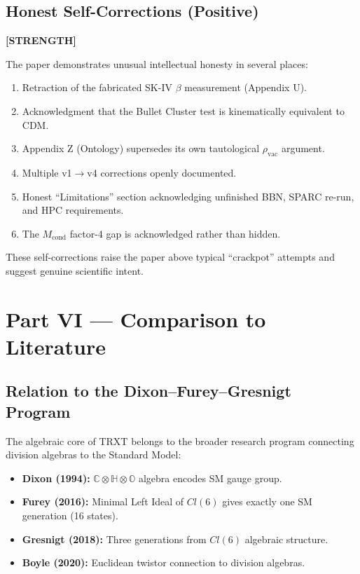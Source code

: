 \documentclass[12pt, a4paper]{article}
\newcommand{\positive}{\textcolor{positive}{\textbf{[STRENGTH]}}}
\begin{document}
\subsection{Honest Self-Corrections (Positive)}
\positive{}

The paper demonstrates unusual intellectual honesty in several places:
\begin{enumerate}
    \item Retraction of the fabricated SK-IV $\beta$ measurement (Appendix U).
    \item Acknowledgment that the Bullet Cluster test is kinematically equivalent to CDM.
    \item Appendix Z (Ontology) supersedes its own tautological $\rho_{\text{vac}}$ argument.
    \item Multiple v1$\to$v4 corrections openly documented.
    \item Honest ``Limitations'' section acknowledging unfinished BBN, SPARC re-run, and HPC requirements.
    \item The $M_{\text{cond}}$ factor-4 gap is acknowledged rather than hidden.
\end{enumerate}

These self-corrections raise the paper above typical ``crackpot'' attempts and suggest genuine scientific intent.

\section{Part VI --- Comparison to Literature}

\subsection{Relation to the Dixon--Furey--Gresnigt Program}

The algebraic core of TRXT belongs to the broader research program connecting division algebras to the Standard Model:

\begin{itemize}
    \item \textbf{Dixon (1994):} $\mathbb{C} \otimes \mathbb{H} \otimes \mathbb{O}$ algebra encodes SM gauge group.
    \item \textbf{Furey (2016):} Minimal Left Ideal of $Cl(6)$ gives exactly one SM generation (16 states).
    \item \textbf{Gresnigt (2018):} Three generations from $Cl(6)$ algebraic structure.
    \item \textbf{Boyle (2020):} Euclidean twistor connection to division algebras.
\end{itemize}
\end{document}

